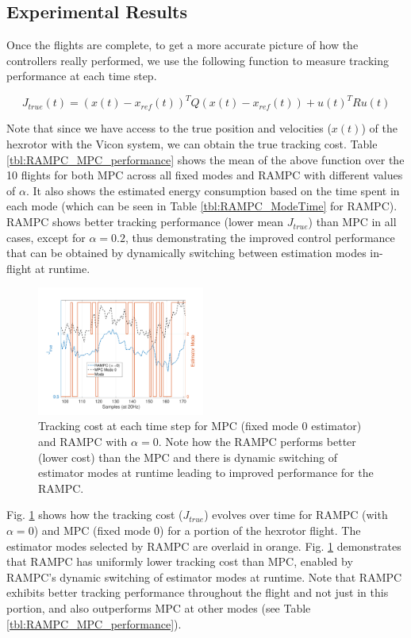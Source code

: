 \subsection{Experimental Results}

Once the flights are complete, to get a more accurate picture of how the controllers really performed, we use the following function to measure tracking performance at each time step.

\begin{equation}
	J_{true}(t) =  (x(t)-x_{ref}(t))^{T}Q(x(t)-x_{ref}(t)) + u(t)^{T}Ru(t)
\end{equation}

Note that since we have access to the true position and velocities ($x(t)$) of the hexrotor with the Vicon system, we can obtain the true tracking cost. Table \ref{tbl:RAMPC_MPC_performance} shows the mean of the above function over the 10 flights for both MPC across all fixed modes and RAMPC with different values of $\alpha$. It also shows the estimated energy consumption based on the time spent in each mode (which can be seen in Table \ref{tbl:RAMPC_ModeTime} for RAMPC). 
RAMPC shows better tracking performance (lower mean $J_{true}$) than MPC in all cases, except for $\alpha = 0.2$, thus demonstrating the improved control performance that can be obtained by dynamically switching between estimation modes in-flight at runtime. 

\begin{figure}[tb]
	\centering
	\includegraphics[width=0.49\textwidth]{figures/CostAndModes}
	\caption{Tracking cost at each time step for MPC (fixed mode 0 estimator) and RAMPC with $\alpha=0$. Note how the RAMPC performs better (lower cost) than the MPC and there is dynamic switching of estimator modes at runtime leading to improved performance for the RAMPC.}	
	\label{fig:CostAndModes}
\end{figure}


Fig. \ref{fig:CostAndModes} shows how the tracking cost ($J_{true}$) evolves over time for RAMPC (with $\alpha=0$) and MPC (fixed mode 0) for a portion of the hexrotor flight. The estimator modes selected by RAMPC are overlaid in orange. Fig. \ref{fig:CostAndModes} demonstrates that RAMPC has uniformly lower tracking cost than MPC, enabled by RAMPC's dynamic switching of estimator modes at runtime. Note that RAMPC exhibits better tracking performance throughout the flight and not just in this portion, and also outperforms MPC at other modes (see Table \ref{tbl:RAMPC_MPC_performance}).

